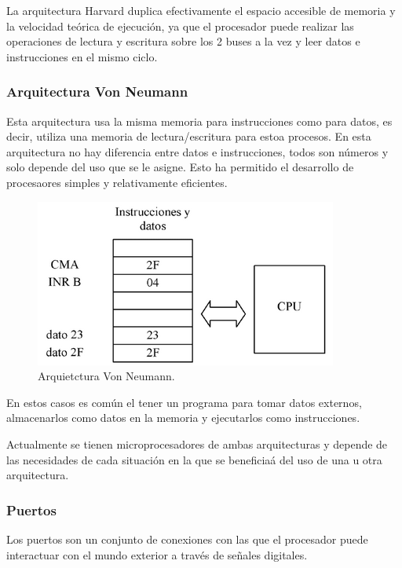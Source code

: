 \documentclass[letterpaper,12pt,oneside]{book}
\begin{document}
				La arquitectura Harvard duplica efectivamente el espacio accesible de memoria y la velocidad teórica de ejecución, ya que el procesador puede realizar las operaciones de lectura y escritura sobre los 2 buses a la vez y leer datos e instrucciones en el mismo ciclo\cite{caprile2012desarrollo}.

				\subsubsection{Arquitectura Von Neumann}
				Esta arquitectura usa la misma memoria para instrucciones como para datos, es decir, utiliza una memoria de lectura/escritura para estoa procesos. En esta arquitectura no hay diferencia entre datos e instrucciones, todos son números y solo depende del uso que se le asigne. Esto ha permitido el desarrollo de procesaores simples y relativamente eficientes.

				\begin{figure}[!htpb]
					\centering
					\includegraphics[scale = 1.0]{Material de Consulta/ArqVNm.PNG}
					\caption[Arquietctura Von Neumann]{Arquietctura Von Neumann.}
					\label{ArqVNm}
				\end{figure}

				En estos casos es común el tener un programa para tomar datos externos, almacenarlos como datos en la memoria y ejecutarlos como instrucciones.

				Actualmente se tienen microprocesadores de ambas arquitecturas y depende de las necesidades de cada situación en la que se beneficiaá del uso de una u otra arquitectura.

				\subsubsection{Puertos}
				Los puertos son un conjunto de conexiones con las que el procesador puede interactuar con el mundo exterior a través de señales digitales.
\end{document}
